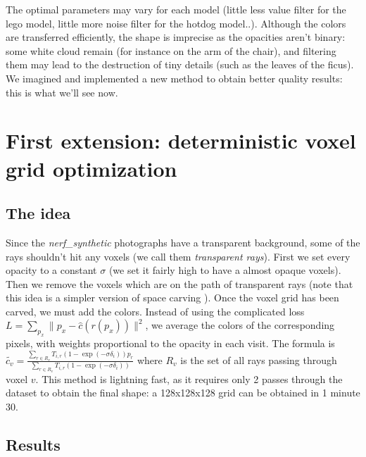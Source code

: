 \documentclass{article}
\begin{document}
The optimal parameters may vary for each model (little less value filter for the lego model, little more noise filter for the hotdog model..). Although the colors are transferred efficiently, the shape is imprecise as the opacities aren't binary: some white cloud remain (for instance on the arm of the chair), and filtering them may lead to the destruction of tiny details (such as the leaves of the ficus). We imagined and implemented a new method to obtain better quality results: this is what we'll see now.

\section{First extension: deterministic voxel grid optimization}\label{sec:extent}

\subsection{The idea}

Since the \textit{nerf\_synthetic} photographs have a transparent background, some of the rays shouldn't hit any voxels (we call them \textit{transparent rays}). First we set every opacity to a constant $\sigma$ (we set it fairly high to have a almost opaque voxels). Then we remove the voxels which are on the path of transparent rays (note that this idea is a simpler version of space carving \cite{spacecarving}). Once the voxel grid has been carved, we must add the colors. Instead of using the complicated loss $L = \sum_{p_x} \|p_x -\hat{c}(r(p_x)) \|^2$, we average the colors of the corresponding pixels, with weights proportional to the opacity in each visit. The formula is $\tilde{c_v} = \frac{ \sum_{r \in R_v} T_{i,r}  (1 - \exp(-\sigma \delta_i)) p_r }{ \sum_{r \in R_v} T_{i,r}  (1 - \exp(-\sigma \delta_i))  }$ where $R_v$ is the set of all rays passing through voxel $v$. This method is lightning fast, as it requires only 2 passes through the dataset to obtain the final shape: a 128x128x128 grid can be obtained in 1 minute 30.

\subsection{Results}
\end{document}
